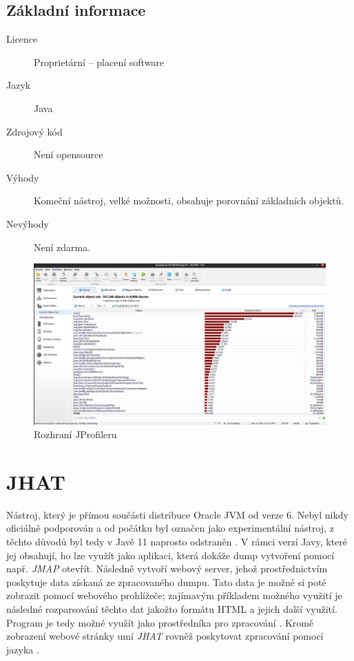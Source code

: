 \clearpage
\subsection{Základní informace}

\begin{description}
    \item[Licence] Proprietární -- placení software
    \item[Jazyk] Java
    \item[Zdrojový kód] Není opensource
    \item[Výhody] Komeční nástroj, velké možnosti, obsahuje porovnání základních objektů.
    \item[Nevýhody] Není zdarma.
\end{description}

\begin{figure}[ht!]
	\centering
	\includegraphics[scale=0.3]{obrazky/jprofiler.png}
	\caption{Rozhraní JProfileru}
	\label{obr-jprofiler}
\end{figure}

\section{JHAT}
Nástroj, který je přímou součásti distribuce Oracle JVM od verze 6. Nebyl nikdy oficiálně podporován a od počátku byl označen jako experimentální nástroj, z těchto důvodů byl tedy v Javě 11 naprosto odstraněn \cite{jep241}\cite{java11migration}. V rámci verzí Javy, které jej obsahují, ho lze využít jako  aplikaci, která dokáže dump vytvoření pomocí např. \textit{JMAP} otevřít. Následně vytvoří webový server, jehož prostřednictvím poskytuje data získaná ze zpracovaného dumpu. Tato data je možné si poté zobrazit pomocí webového prohlížeče; zajímavým příkladem možného využití je následné rozparsování těchto dat jakožto formátu HTML a jejich další využití. Program je tedy možné využít jako prostředníka pro zpracování \cite{jhat}. Kromě  zobrazení webové stránky umí \textit{JHAT} rovněž poskytovat zpracování pomocí jazyka .

